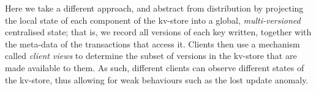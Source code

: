 Here we take a different approach, and abstract from 
distribution by projecting the local state of each component 
of the kv-store into a global, \emph{multi-versioned} centralised state; 
that is, we record all versions of each key written, 
together with the meta-data of the transactions that access it. 
Clients then use a mechanism called \emph{client views} to determine 
the subset of versions in the kv-store that are made available to them.
As such, different clients can observe different states 
of the kv-store, thus allowing for weak behaviours such as the lost update anomaly. 


